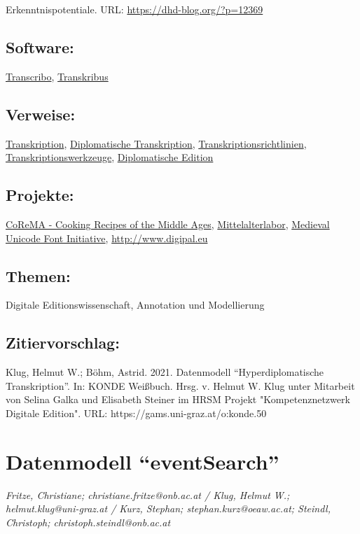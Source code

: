 \documentclass{article}
\begin{document}
\begin{itemize}
                              Erkenntnispotentiale. URL: \url{https://dhd-blog.org/?p=12369}\end{itemize}\subsection*{Software:}\href{http://transcribo.org/en/}{Transcribo}, \href{https://transkribus.eu/Transkribus/}{Transkribus}\subsection*{Verweise:}\href{https://gams.uni-graz.at/o:konde.197}{Transkription}, \href{https://gams.uni-graz.at/o:konde.66}{Diplomatische Transkription}, \href{https://gams.uni-graz.at/o:konde.198}{Transkriptionsrichtlinien}, \href{https://gams.uni-graz.at/o:konde.199}{Transkriptionswerkzeuge}, \href{https://gams.uni-graz.at/o:konde.65}{Diplomatische Edition}\subsection*{Projekte:}\href{https://gams.uni-graz.at/corema}{CoReMA -
                           Cooking Recipes of the Middle Ages}, \href{http://gams.uni-graz.at/context:malab}{Mittelalterlabor}, \href{https://folk.uib.no/hnooh/mufi/}{Medieval
                           Unicode Font Initiative}, \href{http://www.digipal.eu}{http://www.digipal.eu}\subsection*{Themen:}Digitale Editionswissenschaft, Annotation und Modellierung\subsection*{Zitiervorschlag:}Klug, Helmut W.; Böhm, Astrid. 2021. Datenmodell “Hyperdiplomatische Transkription”. In: KONDE Weißbuch. Hrsg. v. Helmut W. Klug unter Mitarbeit von Selina Galka und Elisabeth Steiner im HRSM Projekt "Kompetenznetzwerk Digitale Edition". URL: https://gams.uni-graz.at/o:konde.50\newpage\section*{Datenmodell “eventSearch”} \emph{Fritze, Christiane; christiane.fritze@onb.ac.at / Klug, Helmut W.;
                     helmut.klug@uni-graz.at / Kurz, Stephan; stephan.kurz@oeaw.ac.at; Steindl,
                     Christoph; christoph.steindl@onb.ac.at }\\
        
\end{document}
